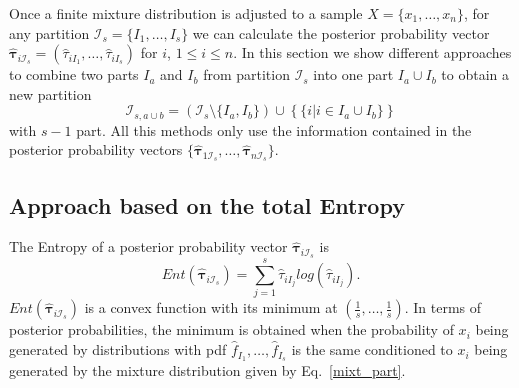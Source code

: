 \documentclass[10pt, a4paper]{article}
\newcommand{\m}[1]{\boldsymbol{#1}}
\begin{document}
Once a finite mixture distribution is adjusted to a sample $X=\{x_1, \dots, x_n\}$, for any partition $\mathcal{I}_s = \{ I_1, \dots, I_s\}$ we can calculate the posterior probability vector   $\hat{\m\tau}_{i \mathcal{I}_s} = \left( \hat{\tau}_{i I_1} , \dots, \hat{\tau}_{i I_s}  \right)$ for $i$, $1 \leq i \leq n$. In this section we show different approaches to combine two parts $I_a$ and $I_b$ from partition $\mathcal{I}_s$ into one part $I_a \cup I_b$ to obtain a new partition
\[
\mathcal{I}_{s, a \cup b} = \left( \mathcal{I}_s \setminus \{ I_a, I_b \} \right) \cup \left\{ \{ i | i \in I_a\cup I_b \} \right\}
\]
with $s-1$ part. All this methods only use the information contained in the posterior probability vectors $\{ \hat{\m\tau}_{1 \mathcal{I}_s},\dots, \hat{\m\tau}_{n \mathcal{I}_s} \}$.


\subsection*{Approach based on the total Entropy}




The Entropy of a posterior probability vector $\hat{\m \tau}_{i \mathcal{I}_s}$ is
\[
Ent( \hat{\m \tau}_{i \mathcal{I}_s} ) = \sum_{j=1}^s \hat{\tau}_{i I_j}  log(\hat{\tau}_{i I_j} ).
\]
$Ent( \hat{\m \tau}_{i \mathcal{I}_s} )$ is a convex function with its minimum at $(\frac{1}{s},\dots,\frac{1}{s})$. In terms of posterior probabilities, the minimum is obtained when the probability of $x_i$ being generated by distributions with pdf $\hat{f}_{I_1}, \dots, \hat{f}_{I_s}$ is the same conditioned to $x_i$ being generated by the mixture distribution given by Eq.~\ref{mixt_part}.
\end{document}
